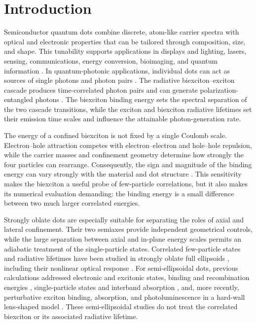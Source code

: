 \section{Introduction}
\label{sec:introduction}

Semiconductor quantum dots combine discrete, atom-like carrier spectra with
optical and electronic properties that can be tailored through composition,
size, and shape. This tunability supports applications in displays and
lighting, lasers, sensing, communications, energy conversion, bioimaging, and
quantum information \cite{garciadearquer2021}. In quantum-photonic
applications, individual dots can act as sources of single photons and photon
pairs \cite{senellart2017}. The radiative biexciton--exciton cascade produces
time-correlated photon pairs \cite{benson2000,moreau2001} and can generate
polarization-entangled photons \cite{akopian2006}. The biexciton binding
energy sets the spectral separation of the two cascade transitions, while the
exciton and biexciton radiative lifetimes set their emission time scales and
influence the attainable photon-generation rate.

The energy of a confined biexciton is not fixed by a single Coulomb scale.
Electron--hole attraction competes with electron--electron and hole--hole
repulsion, while the carrier masses and confinement geometry determine how
strongly the four particles can rearrange. Consequently, the sign and
magnitude of the binding energy can vary strongly with the material and dot
structure \cite{takagahara1989,bayer1998,juska2019}. This sensitivity makes
the biexciton a useful probe of few-particle correlations, but it also makes
its numerical evaluation demanding: the binding energy is a small difference
between two much larger correlated energies.

Strongly oblate dots are especially suitable for separating the roles of
axial and lateral confinement. Their two semiaxes provide independent
geometrical controls, while the large separation between axial and in-plane
energy scales permits an adiabatic treatment of the single-particle states.
Correlated few-particle states and radiative lifetimes have been studied in
strongly oblate full ellipsoids \cite{hayrapetyan2019}, including their
nonlinear optical response \cite{bleyan2022}. For semi-ellipsoidal dots,
previous calculations addressed electronic and excitonic states, binding and
recombination energies \cite{leon2005}, single-particle states and interband
absorption \cite{hayrapetyan2012}, and, more recently, perturbative exciton
binding, absorption, and photoluminescence in a hard-wall lens-shaped model
\cite{gevorgyan2026}. These semi-ellipsoidal studies do not treat the
correlated biexciton or its associated radiative lifetime.

